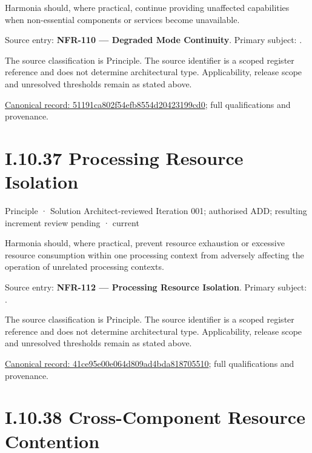 Harmonia should, where practical, continue providing unaffected capabilities when non-essential components or services become unavailable.



Source entry: \textbf{NFR-110 — Degraded Mode Continuity}. Primary subject: \texttt{}.



The source classification is Principle. The source identifier is a scoped register reference and does not determine architectural type. Applicability, release scope and unresolved thresholds remain as stated above.


{\footnotesize \href{../../../../continuum/motivation/principle/51191ca802f54efb8554d20423199cd0.md}{Canonical record: 51191ca802f54efb8554d20423199cd0}; full qualifications and provenance.}\par
\section*{I.10.37 Processing Resource Isolation}
\label{navigation:I.10.37}

\label{element:41ce95e00e064d809ad4bda818705510}
{\small Principle · Solution Architect-reviewed Iteration 001; authorised ADD; resulting increment review pending · current}\par

Harmonia should, where practical, prevent resource exhaustion or excessive resource consumption within one processing context from adversely affecting the operation of unrelated processing contexts.



Source entry: \textbf{NFR-112 — Processing Resource Isolation}. Primary subject: \texttt{}.



The source classification is Principle. The source identifier is a scoped register reference and does not determine architectural type. Applicability, release scope and unresolved thresholds remain as stated above.


{\footnotesize \href{../../../../continuum/motivation/principle/41ce95e00e064d809ad4bda818705510.md}{Canonical record: 41ce95e00e064d809ad4bda818705510}; full qualifications and provenance.}\par
\section*{I.10.38 Cross-Component Resource Contention}
\label{navigation:I.10.38}


